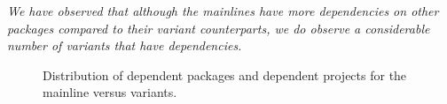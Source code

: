 \begin{framed} 
\noindent
\emph{We have observed that although the mainlines have more dependencies on other packages compared to their variant counterparts, we do observe a considerable number of variants that have dependencies.}
\end{framed}

\begin{figure}[htbp]%
\vspace{-.3cm}
    \centering
    \qquad
    \caption{Distribution of dependent packages and dependent projects for the mainline versus variants.}%
    \label{fig:packages_and_projects}%
\end{figure}

